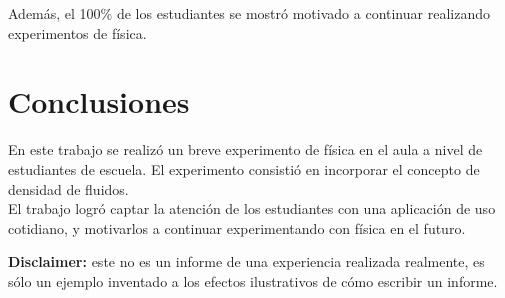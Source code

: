 \documentclass{article}
\begin{document}
Además, el 100\% de los estudiantes se mostró motivado a continuar realizando experimentos de física.



\section{Conclusiones}

En este trabajo se realizó un breve experimento de física en el aula a nivel de estudiantes de escuela. El experimento consistió en incorporar el concepto de densidad de fluidos.\\

El trabajo logró captar la atención de los estudiantes con una aplicación de uso cotidiano, y motivarlos a continuar experimentando con física en el futuro.





\newpage
\textbf{Disclaimer:} este no es un informe de una experiencia realizada realmente, es sólo un ejemplo inventado a los efectos ilustrativos de cómo escribir un informe.\\



\end{document}

